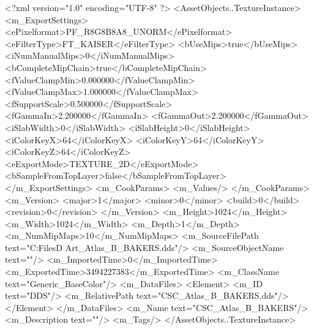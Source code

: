 <?xml version="1.0" encoding="UTF-8" ?>
<AssetObjects..TextureInstance>
	<m_ExportSettings>
		<ePixelformat>PF_R8G8B8A8_UNORM</ePixelformat>
		<eFilterType>FT_KAISER</eFilterType>
		<bUseMips>true</bUseMips>
		<iNumManualMips>0</iNumManualMips>
		<bCompleteMipChain>true</bCompleteMipChain>
		<fValueClampMin>0.000000</fValueClampMin>
		<fValueClampMax>1.000000</fValueClampMax>
		<fSupportScale>0.500000</fSupportScale>
		<fGammaIn>2.200000</fGammaIn>
		<fGammaOut>2.200000</fGammaOut>
		<iSlabWidth>0</iSlabWidth>
		<iSlabHeight>0</iSlabHeight>
		<iColorKeyX>64</iColorKeyX>
		<iColorKeyY>64</iColorKeyY>
		<iColorKeyZ>64</iColorKeyZ>
		<eExportMode>TEXTURE_2D</eExportMode>
		<bSampleFromTopLayer>false</bSampleFromTopLayer>
	</m_ExportSettings>
	<m_CookParams>
		<m_Values/>
	</m_CookParams>
	<m_Version>
		<major>1</major>
		<minor>0</minor>
		<build>0</build>
		<revision>0</revision>
	</m_Version>
	<m_Height>1024</m_Height>
	<m_Width>1024</m_Width>
	<m_Depth>1</m_Depth>
	<m_NumMipMaps>10</m_NumMipMaps>
	<m_SourceFilePath text="C:\Users\Shadow\Desktop\Working Files\3D Art\Textures\CSC_Atlas_B_BAKERS.dds"/>
	<m_SourceObjectName text=""/>
	<m_ImportedTime>0</m_ImportedTime>
	<m_ExportedTime>3494227383</m_ExportedTime>
	<m_ClassName text="Generic_BaseColor"/>
	<m_DataFiles>
		<Element>
			<m_ID text="DDS"/>
			<m_RelativePath text="CSC_Atlas_B_BAKERS.dds"/>
		</Element>
	</m_DataFiles>
	<m_Name text="CSC_Atlas_B_BAKERS"/>
	<m_Description text=""/>
	<m_Tags/>
</AssetObjects..TextureInstance>

